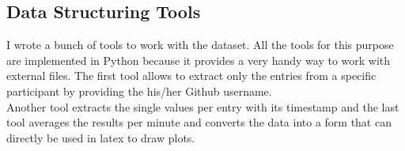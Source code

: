 \subsection{Data Structuring Tools}
I wrote a bunch of tools to work with the dataset. All the tools for this purpose are implemented in Python because it provides a very handy way to work with external files. 
The first tool allows to extract only the entries from a specific participant by providing the his/her Github username.\\
Another tool extracts the single values per entry with its timestamp and the last tool averages the results per minute and converts the data into a form that can directly be used in latex to draw plots.